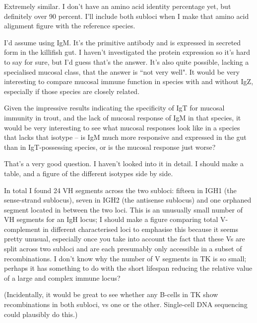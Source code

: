 Extremely similar. I don't have an amino acid identity percentage yet, but definitely over 90 percent. I'll include both subloci when I make that amino acid alignment figure with the reference species.


I'd assume using IgM. It's the primitive antibody and is expressed in secreted form in the killifish gut. I haven't investigated the protein expression so it's hard to say for sure, but I'd guess that's the answer. It's also quite possible, lacking a specialised mucosal class, that the answer is ``not very well". It would be very interesting to compare mucosal immune function in species with and without IgZ, especially if those species are closely related.

Given the impressive results indicating the specificity of IgT for mucosal immunity in trout, and the lack of mucosal response of IgM in that species, it would be very interesting to see what mucosal responses look like in a species that lacks that isotype -- is IgM much more responsive and expressed in the gut than in IgT-possessing species, or is the mucosal response just worse?


That's a very good question. I haven't looked into it in detail. I should make a table, and a figure of the different isotypes side by side.


In total I found 24 VH segments across the two subloci: fifteen in IGH1 (the sense-strand sublocus), seven in IGH2 (the antisense sublocus) and one orphaned segment located in between the two loci. This is an unusually small number of VH segments for an IgH locus; I should make a figure comparing total V-complement in different characterised loci to emphasise this because it seems pretty unusual, especially once you take into account the fact that these Vs are split across two subloci and are each presumably only accessible in a subset of recombinations. I don't know why the number of V segments in TK is so small; perhaps it has something to do with the short lifespan reducing the relative value of a large and complex immune locus?

(Incidentally, it would be great to see whether any B-cells in TK show recombinations in both subloci, vs one or the other. Single-cell DNA sequencing could plausibly do this.)

